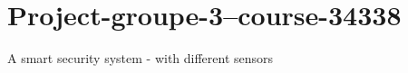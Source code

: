 \chapter{Project-\/groupe-\/3--course-\/34338}
\hypertarget{md__r_e_a_d_m_e}{}\label{md__r_e_a_d_m_e}
\label{md__r_e_a_d_m_e_autotoc_md23}%
%


A smart security system -\/ with different sensors 
